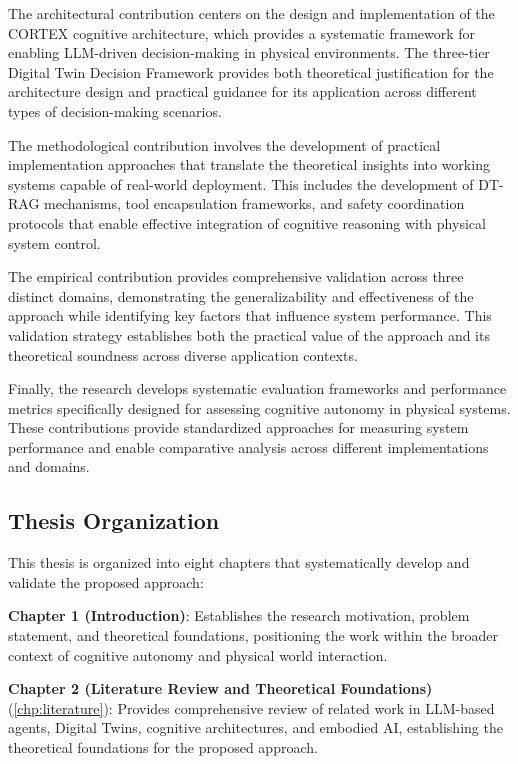 The architectural contribution centers on the design and implementation of the CORTEX cognitive architecture, which provides a systematic framework for enabling LLM-driven decision-making in physical environments. The three-tier Digital Twin Decision Framework provides both theoretical justification for the architecture design and practical guidance for its application across different types of decision-making scenarios.

The methodological contribution involves the development of practical implementation approaches that translate the theoretical insights into working systems capable of real-world deployment. This includes the development of DT-RAG mechanisms, tool encapsulation frameworks, and safety coordination protocols that enable effective integration of cognitive reasoning with physical system control.

The empirical contribution provides comprehensive validation across three distinct domains, demonstrating the generalizability and effectiveness of the approach while identifying key factors that influence system performance. This validation strategy establishes both the practical value of the approach and its theoretical soundness across diverse application contexts.

Finally, the research develops systematic evaluation frameworks and performance metrics specifically designed for assessing cognitive autonomy in physical systems. These contributions provide standardized approaches for measuring system performance and enable comparative analysis across different implementations and domains.

\subsection{Thesis Organization}

This thesis is organized into eight chapters that systematically develop and validate the proposed approach:

\textbf{Chapter 1 (Introduction)}: Establishes the research motivation, problem statement, and theoretical foundations, positioning the work within the broader context of cognitive autonomy and physical world interaction.

\textbf{Chapter 2 (Literature Review and Theoretical Foundations)} (\autoref{chp:literature}): Provides comprehensive review of related work in LLM-based agents, Digital Twins, cognitive architectures, and embodied AI, establishing the theoretical foundations for the proposed approach.

